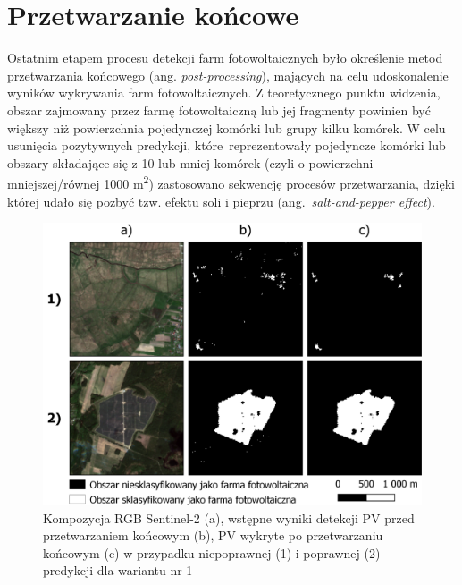 \documentclass{amuthesis}
\begin{document}
\hypertarget{sec-post-processing}{%
\section{Przetwarzanie końcowe}\label{sec-post-processing}}

Ostatnim etapem procesu detekcji farm fotowoltaicznych było określenie
metod przetwarzania końcowego (ang. \emph{post-processing}), mających na
celu udoskonalenie wyników wykrywania farm fotowoltaicznych. Z
teoretycznego punktu widzenia, obszar zajmowany przez farmę
fotowoltaiczną lub jej fragmenty powinien być większy niż powierzchnia
pojedynczej komórki lub grupy kilku komórek. W celu usunięcia
pozytywnych predykcji, które~reprezentowały pojedyncze komórki lub
obszary składające się z 10 lub mniej komórek (czyli o powierzchni
mniejszej/równej 1000 m\textsuperscript{2}) zastosowano sekwencję
procesów przetwarzania, dzięki której udało się pozbyć tzw. efektu soli
i pieprzu (ang.~\emph{salt-and-pepper effect}).

\begin{figure}[t]

{\centering \includegraphics[width=1\textwidth,height=\textheight]{figures/postprocessing_pl.png}

}

\caption{\label{fig-rycina-post-processing}Kompozycja RGB Sentinel-2
(a), wstępne wyniki detekcji PV przed przetwarzaniem końcowym (b), PV
wykryte po przetwarzaniu końcowym (c) w przypadku niepoprawnej (1) i
poprawnej (2) predykcji dla wariantu nr 1}

\end{figure}
\end{document}
